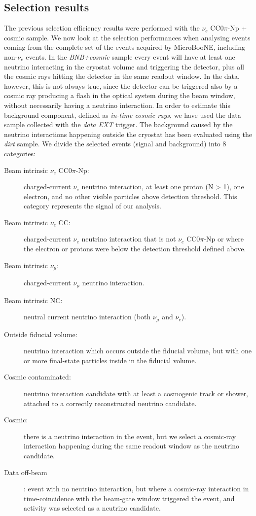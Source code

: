 \subsection{Selection results}\label{sec:numu}
The previous selection efficiency results were performed with the $\nu_{e}$ CC0$\pi$-Np + cosmic sample. We now look at the selection performances when analysing events coming from the complete set of the events acquired by MicroBooNE, including non-$\nu_{e}$ events. In the \emph{BNB+cosmic} sample every event will have at least one neutrino interacting in the cryostat volume and triggering the detector, plus all the cosmic rays hitting the detector in the same readout window. In the data, however, this is not always true, since the detector can be triggered also by a cosmic ray producing a flash in the optical system during the beam window, without necessarily having a neutrino interaction. In order to estimate this background component, defined as \emph{in-time cosmic rays}, we have used the data sample collected with the \emph{data EXT} trigger.
The background caused by the neutrino interactions happening outside the cryostat has been evaluated using the \emph{dirt} sample.
We divide the selected events (signal and background) into 8 categories:
\begin{description}
\item[Beam intrinsic $\nu_{e}$ CC$0\pi$-Np:] charged-current $\nu_{e}$ neutrino interaction, at least one proton (N > 1), one electron, and no other visible particles above detection threshold. This category represents the signal of our analysis.
\item[Beam intrinsic $\nu_{e}$ CC:] charged-current $\nu_{e}$ neutrino interaction that is not $\nu_{e}$ CC$0\pi$-Np or where the electron or protons were below the detection threshold defined above.
\item[Beam intrinsic $\nu_{\mu}$:] charged-current $\nu_{\mu}$ neutrino interaction.
\item[Beam intrinsic NC:] neutral current neutrino interaction (both $\nu_{\mu}$ and $\nu_{e}$).
\item[Outside fiducial volume:] neutrino interaction which occurs outside the fiducial volume, but with one or more final-state particles inside in the fiducial volume.
\item[Cosmic contaminated:] neutrino interaction candidate with at least a cosmogenic track or shower, attached to a correctly reconstructed neutrino candidate.
\item[Cosmic:] there is a neutrino interaction in the event, but we select a cosmic-ray interaction happening during the same readout window as the neutrino candidate.
\item[Data off-beam]: event with no neutrino interaction, but where a cosmic-ray interaction in time-coincidence with the beam-gate window triggered the event, and activity was selected as a neutrino candidate.
\end{description}

